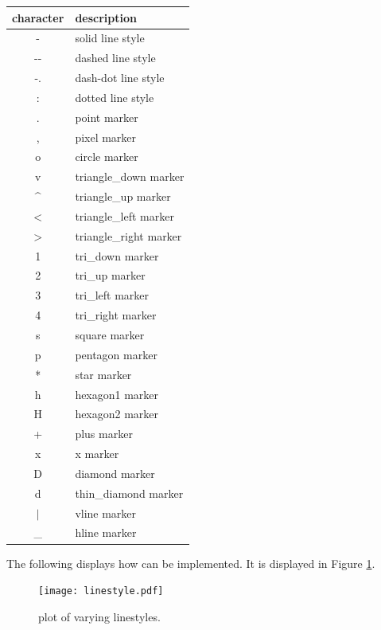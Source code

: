 \begin{table}[H] %
\centering
\begin{tabular}{c|l}
    character & description \\
    \hline
    - & solid line style \\
    -{}- & dashed line style\\
    -. & dash-dot line style \\
    : & dotted line style \\
    . & point marker \\
    , & pixel marker \\
    o & circle marker \\
    v & triangle\_down marker \\
    \^{} & triangle\_up marker \\
    $<$ & triangle\_left marker \\
    $>$ & triangle\_right marker \\
    1 & tri\_down marker \\
    2 & tri\_up marker \\
    3 & tri\_left marker \\
    4 & tri\_right marker \\
    s & square marker \\
    p & pentagon marker \\
    * & star marker \\
    h & hexagon1 marker \\
    H & hexagon2 marker \\
    + & plus marker \\
    x & x marker \\
    D & diamond marker \\
    d & thin\_diamond marker \\
    $|$ & vline marker \\
    \_{} & hline marker \\
\end{tabular}
\end{table}

The following displays how  can be implemented. 
It is displayed in Figure \ref{linestyle}.



\begin{figure} %
\texttt{[image: linestyle.pdf]}
\caption{plot of varying linestyles.}
\label{linestyle} 
\end{figure}


